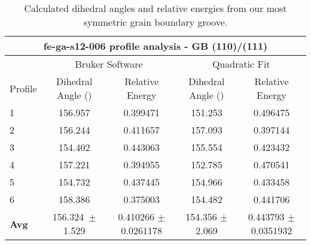 \begin{table}[h!]
	\centering
	\caption{Calculated dihedral angles and relative energies from our most symmetric grain boundary groove.}
	\begin{tabular} { |p{1cm}||c|c|c|c|  } 
		\hline
		\multicolumn{5}{|c|}{fe-ga-s12-006 profile analysis - GB (110)/(111)}\\
		\hline
		~	&\multicolumn{2}{|c|}{Bruker Software}		&\multicolumn{2}{|c|}{Quadratic Fit}	\\
		\hline
		Profile	&Dihedral Angle (\degree)	&Relative Energy	&Dihedral Angle (\degree)	&Relative Energy \\ 
		\hline
		1		&156.957	&0.399471	&151.253	&0.496475	\\
		\hline
		2		&156.244	&0.411657	&157.093	&0.397144	\\
		\hline
		3		&154.402	&0.443063	&155.554	&0.423432	\\
		\hline
		4		&157.221	&0.394955	&152.785	&0.470541	\\
		\hline
		5		&154.732	&0.437445	&154.966	&0.433458	\\
		\hline
		6		&158.386	&0.375003	&154.482	&0.441706	\\
		\hline
		\textbf{Avg}	&156.324~$\pm$1.529	&0.410266 $\pm$0.0261178	&154.356 $\pm$2.069	&0.443793 $\pm$0.0351932\\
		\hline
	\end{tabular}
	\label{groove-analysis}
\end{table}

	


